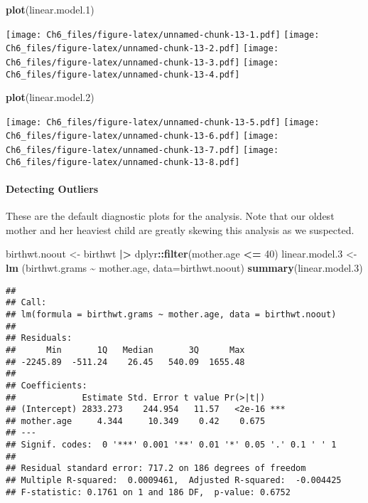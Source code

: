 \documentclass[
]{article}
\newenvironment{Shaded}{\begin{snugshade}}{\end{snugshade}}
\newcommand{\AttributeTok}[1]{\textcolor[rgb]{0.13,0.29,0.53}{#1}}
\newcommand{\DecValTok}[1]{\textcolor[rgb]{0.00,0.00,0.81}{#1}}
\newcommand{\FloatTok}[1]{\textcolor[rgb]{0.00,0.00,0.81}{#1}}
\newcommand{\FunctionTok}[1]{\textcolor[rgb]{0.13,0.29,0.53}{\textbf{#1}}}
\newcommand{\NormalTok}[1]{#1}
\newcommand{\OtherTok}[1]{\textcolor[rgb]{0.56,0.35,0.01}{#1}}
\newcommand{\SpecialCharTok}[1]{\textcolor[rgb]{0.81,0.36,0.00}{\textbf{#1}}}
\begin{document}
\begin{Shaded}
\begin{Highlighting}[]
\FunctionTok{plot}\NormalTok{(linear.model}\FloatTok{.1}\NormalTok{)}
\end{Highlighting}
\end{Shaded}

\texttt{[image: Ch6\_files/figure-latex/unnamed-chunk-13-1.pdf]}
\texttt{[image: Ch6\_files/figure-latex/unnamed-chunk-13-2.pdf]}
\texttt{[image: Ch6\_files/figure-latex/unnamed-chunk-13-3.pdf]}
\texttt{[image: Ch6\_files/figure-latex/unnamed-chunk-13-4.pdf]}

\begin{Shaded}
\begin{Highlighting}[]
\FunctionTok{plot}\NormalTok{(linear.model}\FloatTok{.2}\NormalTok{)}
\end{Highlighting}
\end{Shaded}

\texttt{[image: Ch6\_files/figure-latex/unnamed-chunk-13-5.pdf]}
\texttt{[image: Ch6\_files/figure-latex/unnamed-chunk-13-6.pdf]}
\texttt{[image: Ch6\_files/figure-latex/unnamed-chunk-13-7.pdf]}
\texttt{[image: Ch6\_files/figure-latex/unnamed-chunk-13-8.pdf]}

\paragraph{Detecting Outliers}\label{detecting-outliers}

These are the default diagnostic plots for the analysis. Note that our
oldest mother and her heaviest child are greatly skewing this analysis
as we suspected.

\begin{Shaded}
\begin{Highlighting}[]
\NormalTok{birthwt.noout }\OtherTok{\textless{}{-}}\NormalTok{ birthwt }\SpecialCharTok{|\textgreater{}}\NormalTok{ dplyr}\SpecialCharTok{::}\FunctionTok{filter}\NormalTok{(mother.age }\SpecialCharTok{\textless{}=} \DecValTok{40}\NormalTok{)}
\NormalTok{linear.model}\FloatTok{.3} \OtherTok{\textless{}{-}} \FunctionTok{lm}\NormalTok{ (birthwt.grams }\SpecialCharTok{\textasciitilde{}}\NormalTok{ mother.age, }\AttributeTok{data=}\NormalTok{birthwt.noout)}
\FunctionTok{summary}\NormalTok{(linear.model}\FloatTok{.3}\NormalTok{)}
\end{Highlighting}
\end{Shaded}

\begin{verbatim}
## 
## Call:
## lm(formula = birthwt.grams ~ mother.age, data = birthwt.noout)
## 
## Residuals:
##      Min       1Q   Median       3Q      Max 
## -2245.89  -511.24    26.45   540.09  1655.48 
## 
## Coefficients:
##             Estimate Std. Error t value Pr(>|t|)    
## (Intercept) 2833.273    244.954   11.57   <2e-16 ***
## mother.age     4.344     10.349    0.42    0.675    
## ---
## Signif. codes:  0 '***' 0.001 '**' 0.01 '*' 0.05 '.' 0.1 ' ' 1
## 
## Residual standard error: 717.2 on 186 degrees of freedom
## Multiple R-squared:  0.0009461,  Adjusted R-squared:  -0.004425 
## F-statistic: 0.1761 on 1 and 186 DF,  p-value: 0.6752
\end{verbatim}
\end{document}
